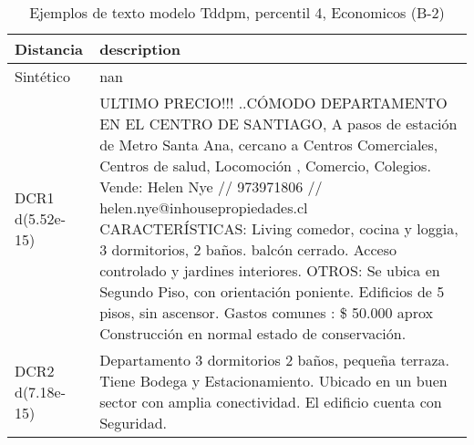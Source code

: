 \begin{table}[H]
\centering
\fontsize{10}{14}\selectfont
\caption{Ejemplos de texto modelo Tddpm, percentil 4, Economicos (B-2)}
\label{table-example-economicos-b-2-tddpm_mlp-4p-text}
\begin{tabular}{|l|m{35em}|}
\hline
\rowcolor[gray]{0.8}
Distancia & description \\
\hline Sintético & nan \\
\hline DCR1 d(5.52e-15) & ULTIMO PRECIO!!! ..C\'OMODO DEPARTAMENTO EN EL CENTRO DE SANTIAGO, A pasos de estaci\'on de Metro Santa Ana, cercano a Centros Comerciales, Centros de salud, Locomoci\'on , Comercio, Colegios.  Vende: Helen Nye // 973971806 // helen.nye@inhousepropiedades.cl  CARACTER\'ISTICAS: Living comedor, cocina y loggia, 3 dormitorios, 2 ba\~nos. balc\'on cerrado. Acceso controlado y jardines interiores.  OTROS: Se ubica en Segundo Piso, con orientaci\'on poniente. Edificios de 5 pisos, sin ascensor. Gastos comunes : \$ 50.000 aprox  Construcci\'on en normal estado de conservaci\'on. \\
\hline DCR2 d(7.18e-15) & Departamento 3 dormitorios 2 ba\~nos, peque\~na terraza. Tiene Bodega y Estacionamiento. Ubicado en un buen sector con amplia conectividad. El edificio cuenta con Seguridad. \\
\hline
\end{tabular}
\end{table}
